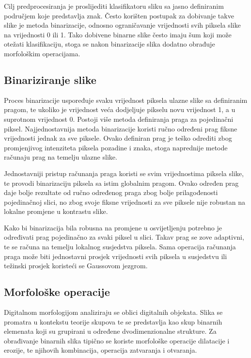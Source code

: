 \documentclass[lmodern, utf8, diplomski, numeric]{fer}
\begin{document}
Cilj predprocesiranja je proslijediti klasifikatoru sliku sa jasno definiranim područjem koje predstavlja znak. Često korišten postupak za dobivanje takve slike je metoda binarizacije, odnosno ograničavanje vrijednosti svih piksela slike na vrijednosti 0 ili 1. Tako dobivene binarne slike često imaju šum koji može otežati klasifikaciju, stoga se nakon binarizacije slika dodatno obrađuje morfološkim operacijama.

\subsection{Binariziranje slike}

Proces binarizacije uspoređuje svaku vrijednost piksela ulazne slike sa definiranim pragom, te ukoliko je vrijednost veća dodjeljuje pikselu novu vrijednost 1, a u suprotnom vrijednost 0. Postoji više metoda definiranja praga za pojedinačni piksel. Najjednostavnija metoda binarizacije koristi ručno određeni prag fiksne vrijednosti jednak za sve piksele. Ovako definiran prag je teško odrediti zbog promjenjivog intenziteta piksela pozadine i znaka, stoga naprednije metode računaju prag na temelju ulazne slike. 

Jednostavniji pristup računanja praga koristi se svim vrijednostima piksela slike, te provodi binarizaciju piksela sa istim globalnim pragom. Ovako određen prag daje bolje rezultate od ručno određenog praga zbog bolje prilagođenosti pojedinačnoj slici, no zbog svoje fiksne vrijednosti za sve piksele nije robustan na lokalne promjene u kontrastu slike. 

Kako bi binarizacija bila robusna na promjene u osvijetljenju potrebno je određivati prag pojedinačno za svaki piksel u slici. Takav prag se zove adaptivni, te se računa na temelju lokalnog susjedstva piksela. Sama operacija računanja praga može biti jednostavni prosjek vrijednosti svih piksela u susjedstvu ili težinski prosjek koristeći se Gaussovom jezgrom.


\subsection{Morfološke operacije}

Digitalnom morfologijom analiziraju se oblici digitalnih objekata. Slika se promatra u kontekstu teorije skupova te se predstavlja kao skup binarnih elemenata koji su grupirani u određene dvodimenzionalne strukture. Za obrađivanje binarnih slika tipično se koriste morfološke operacije dilatacije i erozije, te njihovih kombinacija, operacija zatvaranja i otvaranja. 
\end{document}

